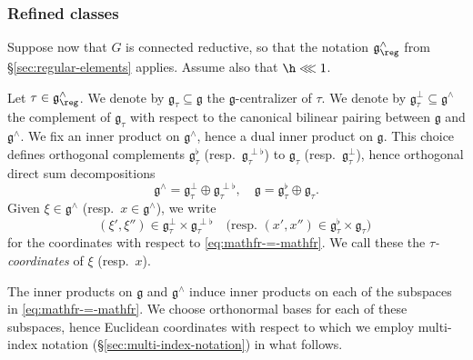 \subsubsection{Refined classes}\label{sec:refined-classes}
Suppose now that $G$ is connected reductive, so that the notation $\mathfrak{g}^\wedge_{\reg}$ from \S\ref{sec:regular-elements} applies.  Assume also that $\h \lll 1$.

Let $\tau \in \mathfrak{g}^\wedge_{\reg}$.  We denote by $\mathfrak{g}_{\tau} \subseteq \mathfrak{g}$ the $\mathfrak{g}$-centralizer of $\tau$.  We denote by $\mathfrak{g}_\tau^{\perp} \subseteq \mathfrak{g}^\wedge$ the complement of $\mathfrak{g}_\tau$ with respect to the canonical bilinear pairing between $\mathfrak{g}$ and $\mathfrak{g}^\wedge$.  We fix an inner product on $\mathfrak{g}^\wedge$, hence a dual inner product on $\mathfrak{g}$.  This choice defines orthogonal complements $\mathfrak{g}_{\tau}^{\flat}$ (resp.\ $\mathfrak{g}_\tau^{\perp \flat}$) to $\mathfrak{g}_\tau$ (resp.\ $\mathfrak{g}_\tau^{\perp}$), hence orthogonal direct sum decompositions 
\begin{equation}\label{eq:mathfr-=-mathfr}
  \mathfrak{g}^\wedge = \mathfrak{g}_\tau^\perp \oplus \mathfrak{g}_\tau^{\perp \flat},
  \quad
  \mathfrak{g} = \mathfrak{g}_\tau^{\flat} \oplus \mathfrak{g}_\tau.
\end{equation}
Given $\xi \in \mathfrak{g}^\wedge$ (resp.\ $x \in \mathfrak{g}^\wedge$), we write
\begin{equation*}
  (\xi ', \xi '' ) \in \mathfrak{g}_\tau^{\perp} \times \mathfrak{g}_{\tau}^{\perp \flat}
  \quad
  \text{
    (resp.
    $(x ', x '' ) \in \mathfrak{g}_\tau^{\flat} \times  \mathfrak{g}_\tau$)
  }
\end{equation*}
for the coordinates with respect to \eqref{eq:mathfr-=-mathfr}.  We call these the \emph{$\tau$-coordinates} of $\xi$ (resp.\ $x$).  

The inner products on $\mathfrak{g}$ and $\mathfrak{g}^\wedge$ induce inner products on each of the subspaces in \eqref{eq:mathfr-=-mathfr}.  We choose orthonormal bases for each of these subspaces, hence Euclidean coordinates with respect to which we employ multi-index notation (\S\ref{sec:multi-index-notation}) in what follows.


